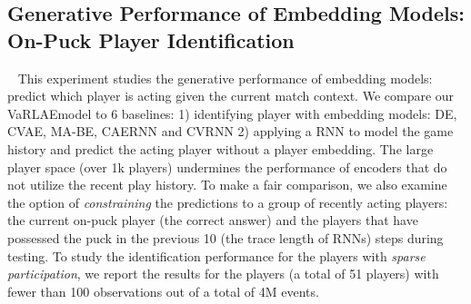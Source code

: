 \documentclass[letterpaper]{article} %
\newcommand{\system}{VaRLAE\;}
\begin{document}
\subsection{Generative Performance of Embedding Models: On-Puck Player Identification}~\label{subsec:identify-player}
This experiment studies the generative performance of embedding models: predict which player is acting given the current match context.
We compare our \system model to 6 baselines: 1) identifying player with embedding models: DE, CVAE, MA-BE, CAERNN and CVRNN 2) applying a RNN to model the game history and predict the acting player without a player embedding. The large player space (over 1k players) undermines the performance of encoders that do not utilize the recent play history. To make a fair comparison, we also examine the option of {\it constraining} the predictions to a group of recently acting players: the current on-puck player (the correct answer) and the players that have possessed the puck in the previous 10 (the trace length of RNNs) steps during testing. To study the identification performance for the players with {\it sparse participation}, we report the results for the players (a total of 51 players) with fewer than 100 observations out of a total of 4M events.
\end{document}
